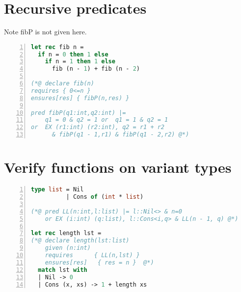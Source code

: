 \section{Recursive predicates}

Note fibP is not given here.

\begin{lstlisting}[language=Caml, mathescape=true, xleftmargin=2em, aboveskip=1em, xrightmargin=1em, numbers=left, frame = {TB}, title=Use inductive predicates to specify recursive function]
let rec fib n =
  if n = 0 then 1 else
    if n = 1 then 1 else 
      fib (n - 1) + fib (n - 2)
      
(*@ declare fib(n)
requires { 0<=n }
ensures[res] { fibP(n,res) }

pred fibP(q1:int,q2:int) |=
    q1 = 0 & q2 = 1 or  q1 = 1 & q2 = 1
or  EX (r1:int) (r2:int), q2 = r1 + r2 
      & fibP(q1 - 1,r1) & fibP(q1 - 2,r2) @*)
\end{lstlisting}



\section{Verify functions on variant types}

\begin{lstlisting}[language=Caml, mathescape=true, xleftmargin=2em, aboveskip=1em, xrightmargin=1em, numbers=left, frame = {TB}, title=Use inductive predicates to specify functions on variant types]
type list = Nil
          | Cons of (int * list)

(*@ pred LL(n:int,l:list) |= l::Nil<> & n=0
    or EX (i:int) (q:list), l::Cons<i,q> & LL(n - 1, q) @*)

let rec length lst =
(*@ declare length(lst:list)
    given (n:int)
    requires      { LL(n,lst) }
    ensures[res]   { res = n }  @*)
  match lst with
  | Nil -> 0
  | Cons (x, xs) -> 1 + length xs
\end{lstlisting}



